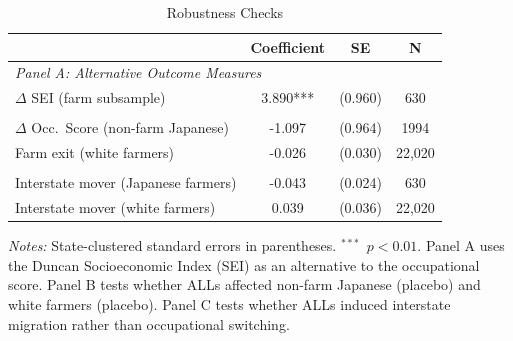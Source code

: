 \begin{table}[htbp]
\centering
\caption{Robustness Checks}
\label{tab:robustness}
\begin{tabular}{lccc}
\hline\hline
 & Coefficient & SE & N \\
\hline
\multicolumn{4}{l}{\textit{Panel A: Alternative Outcome Measures}} \\
$\Delta$ SEI (farm subsample) & 3.890*** & (0.960) & 630 \\
\addlinespace
\multicolumn{4}{l}{\textit{Panel B: Placebo Tests}} \\
$\Delta$ Occ.\ Score (non-farm Japanese) & -1.097 & (0.964) & 1994 \\
Farm exit (white farmers) & -0.026 & (0.030) & 22,020 \\
\addlinespace
\multicolumn{4}{l}{\textit{Panel C: Mobility}} \\
Interstate mover (Japanese farmers) & -0.043 & (0.024) & 630 \\
Interstate mover (white farmers) & 0.039 & (0.036) & 22,020 \\
\hline\hline
\end{tabular}
\begin{tablenotes}
\item \textit{Notes:} State-clustered standard errors in parentheses. $^{***}$~$p<0.01$. Panel A uses the Duncan Socioeconomic Index (SEI) as an alternative to the occupational score. Panel B tests whether ALLs affected non-farm Japanese (placebo) and white farmers (placebo). Panel C tests whether ALLs induced interstate migration rather than occupational switching.
\end{tablenotes}
\end{table}

